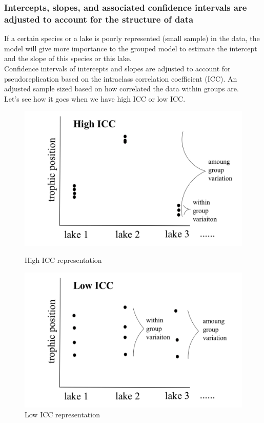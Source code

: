 \documentclass{article}
\begin{document}
\subsubsection{ Intercepts, slopes, and associated confidence intervals are adjusted to account for the structure of data}
If a certain species or a lake is poorly represented (small sample) in the data, the model will give more importance to the grouped model to estimate the intercept and the slope of this species or this lake.\\
Confidence intervals of intercepts and slopes are adjusted to account for pseudoreplication based on the intraclass correlation coefficient (ICC). An adjusted sample sized based on how correlated the data within groups are.\\
Let's see how it goes when we have high ICC or low ICC.
\begin{figure}[h!]
    \begin{minipage}[c]{0,3\textwidth}
    \centering
    \includegraphics[scale = 0.15]{images/high_CIC.pdf}
    \caption{High ICC representation}
    \label{High_icc}
    \end{minipage}
    \begin{minipage}[c]{0,9\textwidth}
    \centering
    \includegraphics[scale = 0.15]{images/low_CIC.pdf}
    \caption{Low ICC representation}
    \label{Low_icc}
    \end{minipage}
\end{figure}
\end{document}
